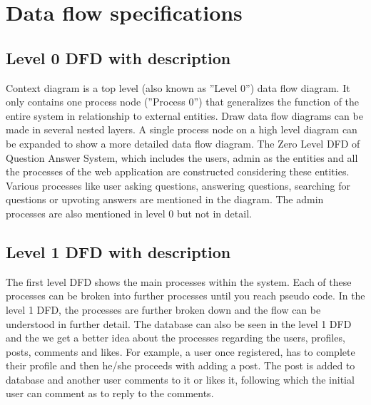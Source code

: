 \documentclass[12pt]{article}
\begin{document}
\section{Data flow specifications}
\subsection{Level 0 DFD with description}
Context diagram is a top level (also known as ”Level 0”) data flow diagram. It only contains one process node (”Process 0”) that generalizes the function of the entire system in relationship to external entities. Draw data flow diagrams can be made in several nested layers. A single process node on a high level diagram can be expanded to show a more detailed data flow diagram.
The Zero Level DFD of Question Answer System, which includes the users, admin as the entities and all the processes of the web application are constructed considering these entities. Various processes like user asking questions, answering questions, searching for questions or upvoting answers are mentioned in the diagram. The admin processes are also mentioned in level 0 but not in detail.
\subsection{Level 1 DFD with description}
The first level DFD shows the main processes within the system. Each of these processes can be broken into further processes until you reach pseudo code. In the level 1 DFD, the processes are further broken down and the flow can be understood in further detail. The database can also be seen in the level 1 DFD and the we get a better idea about the processes regarding the users, profiles, posts, comments and likes. For example, a user once registered, has to complete their profile and then he/she proceeds with adding a post. The post is added to database and another user comments to it or likes it, following which the initial user can comment as to reply to the comments.
\end{document}
